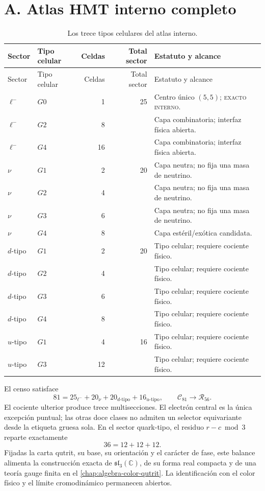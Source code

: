 \section{A. Atlas HMT interno completo}

\begin{longtable}{@{}llrrp{}@{}}
\caption{Los trece tipos celulares del atlas interno.}
\label{tab:atlas-trece-tipos}\\
\toprule
Sector & Tipo celular & Celdas & Total sector & Estatuto y alcance\\
\midrule
\endfirsthead
\toprule
Sector & Tipo celular & Celdas & Total sector & Estatuto y alcance\\
\midrule
\endhead
\(\ell^-\)&\(G0\)&1&25&Centro único \((5,5)\);
\textsc{exacto interno}.\\
\(\ell^-\)&\(G2\)&8&&Capa combinatoria; interfaz física abierta.\\
\(\ell^-\)&\(G4\)&16&&Capa combinatoria; interfaz física abierta.\\
\(\nu\)&\(G1\)&2&20&Capa neutra; no fija una masa de neutrino.\\
\(\nu\)&\(G2\)&4&&Capa neutra; no fija una masa de neutrino.\\
\(\nu\)&\(G3\)&6&&Capa neutra; no fija una masa de neutrino.\\
\(\nu\)&\(G4\)&8&&Capa estéril/exótica candidata.\\
\(d\)-tipo&\(G1\)&2&20&Tipo celular; requiere cociente físico.\\
\(d\)-tipo&\(G2\)&4&&Tipo celular; requiere cociente físico.\\
\(d\)-tipo&\(G3\)&6&&Tipo celular; requiere cociente físico.\\
\(d\)-tipo&\(G4\)&8&&Tipo celular; requiere cociente físico.\\
\(u\)-tipo&\(G1\)&4&16&Tipo celular; requiere cociente físico.\\
\(u\)-tipo&\(G3\)&12&&Tipo celular; requiere cociente físico.\\
\bottomrule
\end{longtable}

El censo satisface
\[
 81=25_{\ell^-}+20_\nu+20_{d\text{-tipo}}+16_{u\text{-tipo}},
 \qquad
 \mathcal C_{81}\longrightarrow\mathcal R_{56}.
\]
El cociente ulterior produce trece multisecciones. El electrón central es la
única excepción puntual; las otras doce clases no admiten un selector
equivariante desde la etiqueta gruesa sola. En el sector quark-tipo, el
residuo \(r-c\bmod3\) reparte exactamente
\[
 36=12+12+12.
\]
Fijadas la carta qutrit, su base, su orientación y el carácter de fase, este
balance alimenta la construcción exacta de
\(\mathfrak{sl}_3(\mathbb C)\), de su forma real compacta y de una teoría gauge
finita en el \cref{chap:algebra-color-qutrit}. La identificación con el color
físico y el límite cromodinámico permanecen abiertos.

